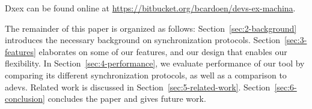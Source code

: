 Dxex can be found online at \url{https://bitbucket.org/bcardoen/devs-ex-machina}.

The remainder of this paper is organized as follows:
Section~\ref{sec:2-background} introduces the necessary background on synchronization protocols.
Section~\ref{sec:3-features} elaborates on some of our features, and our design that enables our flexibility.
In Section~\ref{sec:4-performance}, we evaluate performance of our tool by comparing its different synchronization protocols, as well as a comparison to adevs.
Related work is discussed in Section~\ref{sec:5-related-work}.
Section~\ref{sec:6-conclusion} concludes the paper and gives future work.
